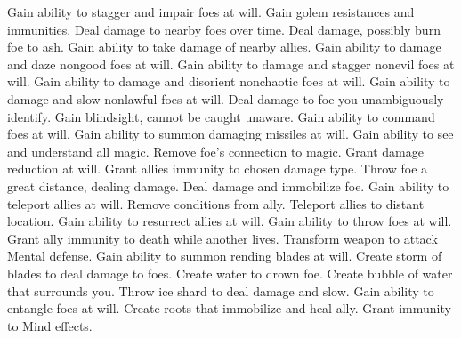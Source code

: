     {Gain ability to stagger and impair foes at will.}
    {Gain golem resistances and immunities.}
    {Deal damage to nearby foes over time.}
    {Deal damage, possibly burn foe to ash.}
    {Gain ability to take damage of nearby allies.}
    {Gain ability to damage and daze nongood foes at will.}
    {Gain ability to damage and stagger nonevil foes at will.}
    {Gain ability to damage and disorient nonchaotic foes at will.}
    {Gain ability to damage and slow nonlawful foes at will.}
    {Deal damage to foe you unambiguously identify.}
    {Gain blindsight, cannot be caught unaware.}
    {Gain ability to command foes at will.}
    {Gain ability to summon damaging missiles at will.}
    {Gain ability to see and understand all magic.}
    {Remove foe's connection to magic.}
    {Grant damage reduction at will.}
    {Grant allies immunity to chosen damage type.}
    {Throw foe a great distance, dealing damage.}
    {Deal damage and immobilize foe.}
    {Gain ability to teleport allies at will.}
    {Remove conditions from ally.}
    {Teleport allies to distant location.}
    {Gain ability to resurrect allies at will.}
    {Gain ability to throw foes at will.}
    {Grant ally immunity to death while another lives.}
    {Transform weapon to attack Mental defense.}
    {Gain ability to summon rending blades at will.}
    {Create storm of blades to deal damage to foes.}
    {Create water to drown foe.}
    {Create bubble of water that surrounds you.}
    {Throw ice shard to deal damage and slow.}
    {Gain ability to entangle foes at will.}
    {Create roots that immobilize and heal ally.}
    {Grant immunity to Mind effects.}


